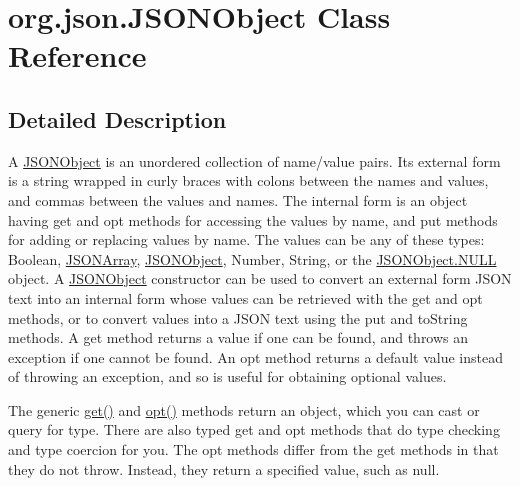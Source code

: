 \hypertarget{classorg_1_1json_1_1JSONObject}{\section{org.\-json.\-J\-S\-O\-N\-Object Class Reference}
\label{classorg_1_1json_1_1JSONObject}
}


\subsection{Detailed Description}
A \hyperlink{classorg_1_1json_1_1JSONObject}{J\-S\-O\-N\-Object} is an unordered collection of name/value pairs. Its external form is a string wrapped in curly braces with colons between the names and values, and commas between the values and names. The internal form is an object having {\ttfamily get} and {\ttfamily opt} methods for accessing the values by name, and {\ttfamily put} methods for adding or replacing values by name. The values can be any of these types\-: {\ttfamily Boolean}, {\ttfamily \hyperlink{classorg_1_1json_1_1JSONArray}{J\-S\-O\-N\-Array}}, {\ttfamily \hyperlink{classorg_1_1json_1_1JSONObject}{J\-S\-O\-N\-Object}}, {\ttfamily Number}, {\ttfamily String}, or the {\ttfamily \hyperlink{classorg_1_1json_1_1JSONObject_a01c74a31a1abfd34ab13beb9347855ac}{J\-S\-O\-N\-Object.\-N\-U\-L\-L}} object. A \hyperlink{classorg_1_1json_1_1JSONObject}{J\-S\-O\-N\-Object} constructor can be used to convert an external form J\-S\-O\-N text into an internal form whose values can be retrieved with the {\ttfamily get} and {\ttfamily opt} methods, or to convert values into a J\-S\-O\-N text using the {\ttfamily put} and {\ttfamily to\-String} methods. A {\ttfamily get} method returns a value if one can be found, and throws an exception if one cannot be found. An {\ttfamily opt} method returns a default value instead of throwing an exception, and so is useful for obtaining optional values. 

The generic {\ttfamily \hyperlink{classorg_1_1json_1_1JSONObject_ac98329762a354373a0d3fddc2855dd61}{get()}} and {\ttfamily \hyperlink{classorg_1_1json_1_1JSONObject_a51eeabb3fde00474d3ffd7381ad5d311}{opt()}} methods return an object, which you can cast or query for type. There are also typed {\ttfamily get} and {\ttfamily opt} methods that do type checking and type coercion for you. The opt methods differ from the get methods in that they do not throw. Instead, they return a specified value, such as null. 

